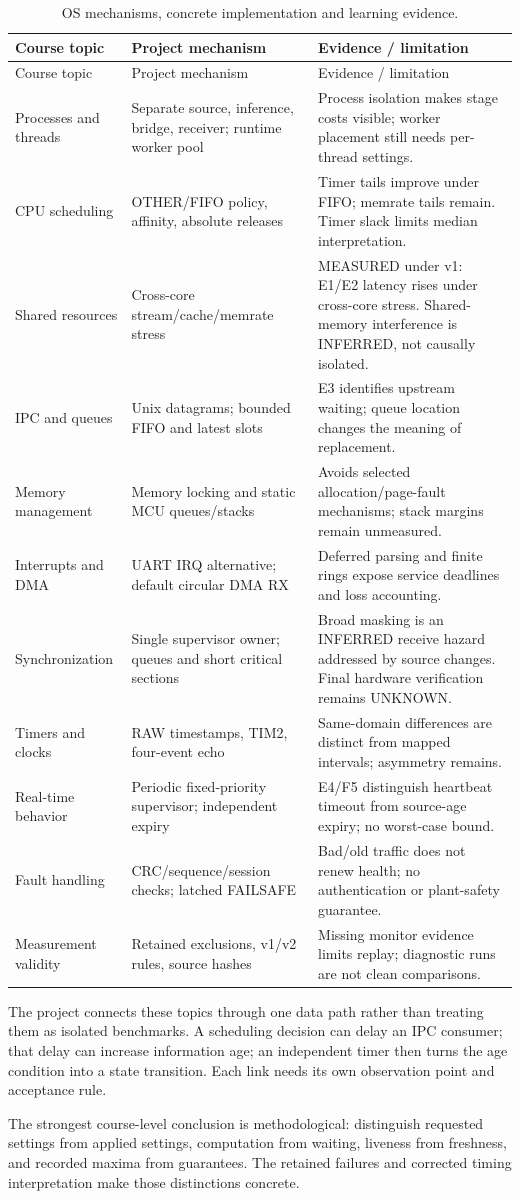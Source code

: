 \documentclass[a4paper,11pt]{article}
\begin{document}
\begin{longtable}{L{.22\linewidth}L{.32\linewidth}L{.34\linewidth}}
\caption{OS mechanisms, concrete implementation and learning evidence.}\\
\toprule Course topic & Project mechanism & Evidence / limitation\\\midrule\endfirsthead
\toprule Course topic & Project mechanism & Evidence / limitation\\\midrule\endhead
Processes and threads & Separate source, inference, bridge, receiver; runtime worker pool & Process isolation makes stage costs visible; worker placement still needs per-thread settings.\\
CPU scheduling & OTHER/FIFO policy, affinity, absolute releases & Timer tails improve under FIFO; memrate tails remain. Timer slack limits median interpretation.\\
Shared resources & Cross-core stream/cache/memrate stress & MEASURED under v1: E1/E2 latency rises under cross-core stress. Shared-memory interference is INFERRED, not causally isolated.\\
IPC and queues & Unix datagrams; bounded FIFO and latest slots & E3 identifies upstream waiting; queue location changes the meaning of replacement.\\
Memory management & Memory locking and static MCU queues/stacks & Avoids selected allocation/page-fault mechanisms; stack margins remain unmeasured.\\
Interrupts and DMA & UART IRQ alternative; default circular DMA RX & Deferred parsing and finite rings expose service deadlines and loss accounting.\\
Synchronization & Single supervisor owner; queues and short critical sections & Broad masking is an INFERRED receive hazard addressed by source changes. Final hardware verification remains UNKNOWN.\\
Timers and clocks & RAW timestamps, TIM2, four-event echo & Same-domain differences are distinct from mapped intervals; asymmetry remains.\\
Real-time behavior & Periodic fixed-priority supervisor; independent expiry & E4/F5 distinguish heartbeat timeout from source-age expiry; no worst-case bound.\\
Fault handling & CRC/sequence/session checks; latched FAILSAFE & Bad/old traffic does not renew health; no authentication or plant-safety guarantee.\\
Measurement validity & Retained exclusions, v1/v2 rules, source hashes & Missing monitor evidence limits replay; diagnostic runs are not clean comparisons.\\
\bottomrule
\end{longtable}
The project connects these topics through one data path rather than treating them as isolated benchmarks. A scheduling decision can delay an IPC consumer; that delay can increase information age; an independent timer then turns the age condition into a state transition. Each link needs its own observation point and acceptance rule.

The strongest course-level conclusion is methodological: distinguish requested settings from applied settings, computation from waiting, liveness from freshness, and recorded maxima from guarantees. The retained failures and corrected timing interpretation make those distinctions concrete.
\end{document}
